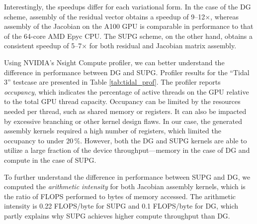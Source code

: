 
Interestingly, the speedups differ for each variational form. In the case of the DG scheme, assembly of the residual vector obtains a speedup of 9--12${\times}$, whereas assembly of the Jacobian on the A100 GPU is comparable in performance to that of the 64-core AMD Epyc CPU. The SUPG scheme, on the other hand, obtains a consistent speedup of 5--7${\times}$ for both residual and Jacobian matrix assembly.

Using NVIDIA's Nsight Compute profiler, we can better understand the difference in performance between DG and SUPG.
Profiler results for the ``Tidal 3'' testcase are presented in Table \ref{tab:tidal_prof}. The profiler reports \textit{occupancy}, which indicates the percentage of active threads on the GPU relative to the total GPU thread capacity. Occupancy can be limited by the resources needed per thread, such as shared memory or registers. It can also be impacted by excessive branching or other kernel design flaws. In our case, the generated assembly kernels required a high number of registers, which limited the occupancy to under 20\,\%. However, both the DG and SUPG kernels are able to utilize a large fraction of the device throughput---memory in the case of DG and compute in the case of SUPG.

To further understand the difference in performance between SUPG and DG, we computed the \textit{arithmetic intensity} for both Jacobian assembly kernels, which is the ratio of FLOPS performed to bytes of memory accessed. The arithmetic intensity is 0.22 FLOPS/byte for SUPG and 0.1 FLOPS/byte for DG, which partly explains why SUPG achieves higher compute throughput than DG.

